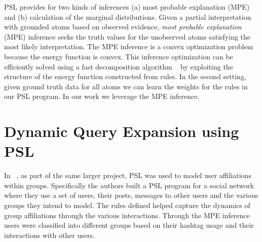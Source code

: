 PSL provides for two kinds of inferences (a) most probable explanation (MPE) 
and (b) calculation of the marginal distributions. 
Given a partial interpretation with grounded atoms based on observed evidence, \emph{most probable explanation} (MPE) inference seeks the truth values for the unobserved atoms satisfying the most likely interpretation. 
The MPE inference is a convex optimization problem because the energy function is convex. 
This inference optimization can be efficiently solved using a fast decomposition algorithm ~\cite{bach2012scaling,bach2013hinge} by exploiting the structure of the energy function constructed from rules.
In the second setting, given ground truth data for all atoms we can learn the weights for the rules in our PSL program.
In our work we leverage the MPE inference.

\section{Dynamic Query Expansion using PSL}
In ~\cite{huang2012social}, as part of the same larger project,
PSL was used
to model user affiliations within groups. 
Specifically the authors built a PSL program
for a  social network where they use a set of users, their posts, messages to other users and the various groups they intend to model. 
The rules defined helped capture the dynamics of group affiliations through the various interactions.
Through the MPE inference users were classified into different groups based on their hashtag usage and their interactions with other users.

